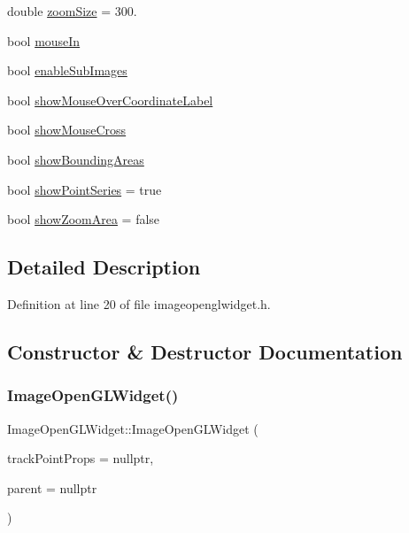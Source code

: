 \begin{DoxyCompactItemize}
\item 
double \mbox{\hyperlink{class_image_open_g_l_widget_ad8c3b1eb294a2dba58026490f1c46aed}{zoom\+Size}} = 300.
\item 
bool \mbox{\hyperlink{class_image_open_g_l_widget_af8723e437fd5eec91127e380adc1ad2a}{mouse\+In}}
\item 
bool \mbox{\hyperlink{class_image_open_g_l_widget_a4680fd2bd5b3e6ef189badc3de509d89}{enable\+Sub\+Images}}
\item 
bool \mbox{\hyperlink{class_image_open_g_l_widget_af9f269f12c2c29d314995db1ddb2005f}{show\+Mouse\+Over\+Coordinate\+Label}}
\item 
bool \mbox{\hyperlink{class_image_open_g_l_widget_a4bd1fa338477adeef44c2bd39b3e30ab}{show\+Mouse\+Cross}}
\item 
bool \mbox{\hyperlink{class_image_open_g_l_widget_a3d3bb1ef06c353c66215cdff9bf9941b}{show\+Bounding\+Areas}}
\item 
bool \mbox{\hyperlink{class_image_open_g_l_widget_a5be69a20fb48ac0b5e9e6f78a187b488}{show\+Point\+Series}} = true
\item 
bool \mbox{\hyperlink{class_image_open_g_l_widget_ad3a65bd8f5c6994c4f32445f519bfc99}{show\+Zoom\+Area}} = false
\end{DoxyCompactItemize}


\subsection{Detailed Description}


Definition at line 20 of file imageopenglwidget.\+h.



\subsection{Constructor \& Destructor Documentation}
\mbox{\label{class_image_open_g_l_widget_a7d4da279a6dc2a37cdceb4d32233ecbd}} 
\subsubsection{\texorpdfstring{ImageOpenGLWidget()}{ImageOpenGLWidget()}}
{\footnotesize\ttfamily Image\+Open\+G\+L\+Widget\+::\+Image\+Open\+G\+L\+Widget (\begin{DoxyParamCaption}\item[{\mbox{\hyperlink{struct_track_point_property}{Track\+Point\+Property}} $\ast$}]{track\+Point\+Props = {\ttfamily nullptr},  }\item[{Q\+Widget $\ast$}]{parent = {\ttfamily nullptr} }\end{DoxyParamCaption})}



